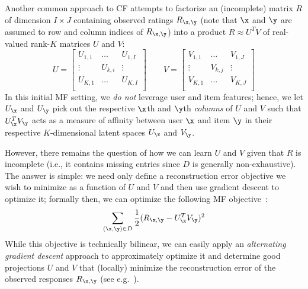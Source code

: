 Another common approach to CF attempts to factorize an (incomplete)
matrix $R$ of dimension $I \times J$ containing observed ratings $R_{\x,\y}$ 
(note that $\x$ and $\y$ are assumed to row and column indices of $R_{\x,\y}$)
into a product $R \approx U^T V$ of real-valued
rank-$K$ matrices $U$ and $V$:
\begin{equation*}
U = 
\begin{bmatrix}
  U_{1,1} & \hdots  & U_{1,I} \\
  \vdots  & U_{k,i} & \vdots  \\
  U_{K,1} & \hdots  & U_{K,I} \\
\end{bmatrix}
\qquad 
V = 
\begin{bmatrix}
  V_{1,1} & \hdots  & V_{1,J} \\
  \vdots  & V_{k,j} & \vdots  \\
  V_{K,1} & \hdots  & V_{K,J} \\
\end{bmatrix}
\end{equation*}
In this initial MF setting, we \emph{do not} leverage user and item features;
hence, we let $U_\x$ and $U_\y$ pick out the respective $\x$th and $\y$th 
\emph{columns} of $U$ and $V$ such that $U_\x^T V_\y$ acts as a
measure of affinity between user $\x$ and item $\y$ in their respective %
$K$-dimensional latent spaces $U_\x$ and $V_\y$.

However, there remains the question of how we can learn $U$ and $V$
given that $R$ is incomplete (i.e., it contains missing entries since
$D$ is generally non-exhaustive).  The answer is simple: we need only
define a reconstruction error objective we wish to minimize as a
function of $U$ and $V$ and then use gradient descent to optimize it;
formally then, we can optimize the following MF objective~\cite{pmf}:
\begin{align}
\sum_{(\x,\y) \in D} \frac{1}{2} (R_{\x,\y} - U_\x^T V_\y)^2 \label{eq:basic_mf}
\end{align}
While this objective is technically bilinear, 
we can easily apply an
\emph{alternating gradient descent} approach to approximately
optimize it and determine good projections $U$ and
$V$ that (locally) minimize the reconstruction error of the observed
responses $R_{\x,\y}$ (see e.g.~\cite{pmf}). %

